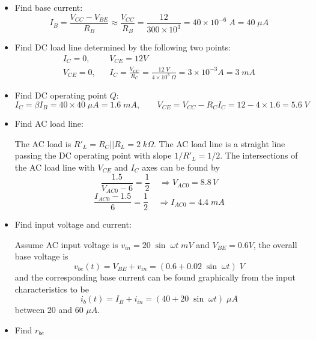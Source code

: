 \documentclass{article}
\begin{document}
\begin{itemize}
\item Find base current:
  \begin{equation}
  I_B=\frac{V_{CC}-V_{BE}}{R_B} \approx \frac{V_{CC}}{R_B}=\frac{12}{300\times 10^3}
  =40\times 10^{-6}\; A=40\;\mu A	
  \end{equation}

\item Find DC load line determined by the following two points:
  \begin{eqnarray}
    I_C=0, && V_{CE}=12V
    \nonumber\\
    V_{CE}=0, && I_C=\frac{V_{CC}}{R_C}=\frac{12\;V}{4\times 10^3\;\Omega}
    =3\times 10^{-3}A=3 \;mA
  \end{eqnarray}

\item Find DC operating point $Q$: 
  \begin{equation}
  I_C=\beta I_B=40\times 40\;\mu A=1.6\;mA,\;\;\;\;\;\;\;
  V_{CE}=V_{CC}-R_CI_C=12-4\times 1.6=5.6\;V
  \end{equation}

\item Find AC load line: 

  The AC load is $R'_L=R_C||R_L=2\;k\Omega$. The AC load line is a 
  straight line passing the DC operating point with slope $1/R'_L=1/2$.
  The intersections of the AC load line with $V_{CE}$ and $I_C$ axes can 
  be found by
  \begin{equation}
  \frac{1.5}{V_{AC0}-6}=\frac{1}{2}\;\;\;\;\Longrightarrow V_{AC0}=8.8\,V
  \end{equation}
  \begin{equation}
  \frac{I_{AC0}-1.5}{6}=\frac{1}{2}\;\;\;\;\Longrightarrow I_{AC0}=4.4\;mA 
  \end{equation}
\item Find input voltage and current:
  
  Assume AC input voltage is $v_{in}=20\;\sin\;\omega t\;mV$ and 
  $V_{BE}=0.6V$, the overall base voltage is
  \begin{equation}
  v_{be}(t)=V_{BE}+v_{in}=(0.6+0.02\;\sin\;\omega t)\;V
  \end{equation}
  and the corresponding base current can be found graphically from the 
  input characteristics to be 
  \begin{equation}
  i_b(t)=I_B+i_{in}=(40+20\;\sin\;\omega t)\;\mu A
  \end{equation} 
  between 20 and 60 $\mu A$. 
\item Find $r_{be}$
  

\end{itemize}
\end{document}
